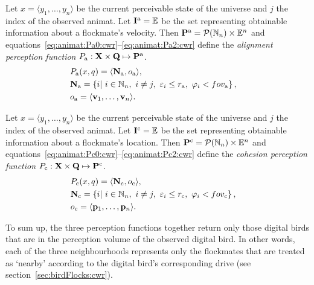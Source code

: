 \begin{defn}
\label{def:animat:Pa:cwr}
Let $x=\langle y_1,\ldots,y_n \rangle$ be the current perceivable state of the universe and $j$ the index of the observed animat. Let ${\mathbf{I}}^\mathrm{a}=\mathbb{E}$ be the set representing obtainable information about a flockmate's velocity. Then ${\mathbf{P}}^\mathrm{a}={\mathcal{P}(\mathbb{N}_n)} \times \mathbb{E}^n$ and equations~\eqref{eq:animat:Pa0:cwr}--\eqref{eq:animat:Pa2:cwr} define the \emph{alignment perception function} $P_\mathrm{a}: {\mathbf{X}} \times {\ensuremath{\mathbf{Q}}} \mapsto {\ensuremath{\mathbf{P}}}^\mathrm{a}$.
\begin{eqnarray}
& P_\mathrm{a}(x,q)=\langle\set{N}_\mathrm{a},o_\mathrm{a}\rangle, & \label{eq:animat:Pa0:cwr} \\
& \set{N}_\mathrm{a}=\left\{i|\ i \in \N_n,\ i \neq j,\ \varepsilon_i%
 \leq r_\mathrm{a},\ \varphi_i%
 < \fov_\mathrm{a}\right\}, & \\ 
& o_\mathrm{a}=\langle \vect{v}_1,\ldots,\vect{v}_n\rangle. & \label{eq:animat:Pa2:cwr}
\end{eqnarray}
\end{defn}

\begin{defn}
\label{def:animat:Pc:cwr}
Let $x=\langle y_1,\ldots,y_n \rangle$ be the current perceivable state of the universe and $j$ the index of the observed animat. Let ${\mathbf{I}}^\mathrm{c}=\mathbb{E}$ be the set representing obtainable information about a flockmate's location. Then ${\mathbf{P}}^\mathrm{c}={\mathcal{P}(\mathbb{N}_n)} \times \mathbb{E}^n$ and equations~\eqref{eq:animat:Pc0:cwr}--\eqref{eq:animat:Pc2:cwr} define the \emph{cohesion perception function} $P_\mathrm{c}: {\mathbf{X}} \times {\ensuremath{\mathbf{Q}}} \mapsto {\ensuremath{\mathbf{P}}}^\mathrm{c}$.
\begin{eqnarray}
& P_\mathrm{c}(x,q)=\langle\set{N}_\mathrm{c},o_\mathrm{c}\rangle, & \label{eq:animat:Pc0:cwr} \\
& \set{N}_\mathrm{c}=\left\{i|\ i \in \N_n,\ i \neq j,\ \varepsilon_i%
 \leq r_\mathrm{c},\ \varphi_i%
 < \fov_\mathrm{c}\right\}, & \\
& o_\mathrm{c}=\langle \vect{p}_1,\ldots,\vect{p}_n\rangle. & \label{eq:animat:Pc2:cwr}
\end{eqnarray}
\end{defn}

To sum up, the three perception functions together return only those digital birds that are in the perception volume of the observed digital bird. In other words, each of the three neighbourhoods represents only the flockmates that are treated as `nearby' according to the digital bird's corresponding drive \cite{reynolds:1987} (see section~\ref{sec:birdFlocks:cwr}).

